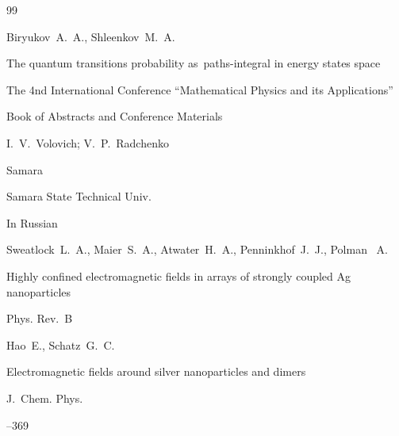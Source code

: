 \begin{thebibliography}{99}






\by  Biryukov~A.~A., Shleenkov~M.~A.

\paper The quantum transitions probability as~paths-integral in energy states space


\inbook  The 4nd International Conference ``Mathematical Physics and its Applications''

\bookinfo Book of Abstracts and Conference Materials

\eds I.~V.~Volovich; V.~P.~Radchenko

\publaddr Samara

\publ Samara State Technical Univ.


\lang In Russian








\by Sweatlock~L.~A., Maier~S.~A., Atwater~H.~A., Penninkhof~J.~J., Polman~ A. 

\paper Highly confined electromagnetic fields in arrays of strongly coupled Ag nanoparticles 

\jour Phys. Rev.~B











\by Hao~E., Schatz~G.~C.

\paper Electromagnetic fields around silver nanoparticles and dimers 

\jour J.~Chem. Phys.




--369







\end{thebibliography}
